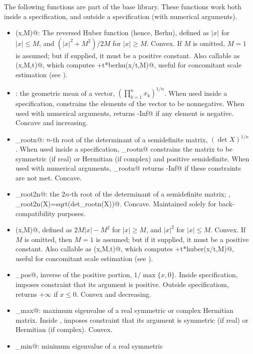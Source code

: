\documentclass[12pt]{article}
\begin{document}
The following functions are part of the base \cvx library.
These functions work both inside a \cvx specification,
and outside a \cvx specification (with numerical arguments).
\begin{itemize}
\item \verb@berhu(x,M)@: The reversed Huber function (hence, Berhu), defined as
$|x|$ for $|x|\leq M$, and $(|x|^2+M^2)/2M$ for $|x|\geq M$. Convex. If $M$
is omitted, $M=1$ is assumed; but if supplied, it must be a positive constant.
Also callable as \verb@berhu(x,M,t)@, which computes \verb@t+t*berhu(x/t,M)@,
useful for concomitant scale estimation (see \cite{Owen}).
\item \verb@geomean@: the geometric mean of a vector, $\left( \prod_{k=1}^n x_k \right)^{1/n}$. When
used inside a \cvx specification, \verb@geomean@ constrains the elements of the vector
to be nonnegative. When used with numerical arguments, \verb@geomean@ returns \verb@-Inf@
if any element is negative.
Concave and increasing.
\item \verb@det_rootn@: $n$-th root of the determinant of a semidefinite matrix,
$(\det X)^{1/n}$. When used inside a \cvx specification, \verb@det_rootn@ constrains
the matrix to be symmetric (if real) or Hermitian (if complex) and positive semidefinite. 
When used with numerical arguments, \verb@det_rootn@ returns \verb@-Inf@ if these
constraints are not met. Concave.
\item \verb@det_root2n@: the $2n$-th root of the determinant of a semidefinite
matrix; \ie, \verb@det_root2n(X)=sqrt(det_rootn(X))@. Concave. Maintained
solely for back-compatibility purposes.
\item \verb@huber(x,M)@, defined as $2M|x|-M^2$ for $|x|\geq M$,
and $|x|^2$ for $|x|\leq M$. Convex. If $M$ is omitted, then $M=1$ is
assumed; but if it supplied, it must be a positive constant.
Also callable as \verb@huber(x,M,t)@, which computes \verb@t+t*huber(x/t,M)@,
useful for concomitant scale estimation
(see \cite{Owen}).
\item \verb@inv_pos@, inverse of the positive portion, $1/\max\{x,0\}$.
Inside \cvx specification,
imposes constraint that its argument is positive.
Outside \cvx specificatiom, returns $+\infty$ if $x\leq 0$.
Convex and decreasing.
\item \verb@lambda_max@: maximum eigenvalue of a real symmetric 
or complex Hermitian matrix.
Inside \cvx, imposes constraint that its argument 
is symmetric (if real) or Hermitian (if complex).
Convex.
\item \verb@lambda_min@: minimum eigenvalue of a real symmetric 

\end{itemize}
\end{document}
